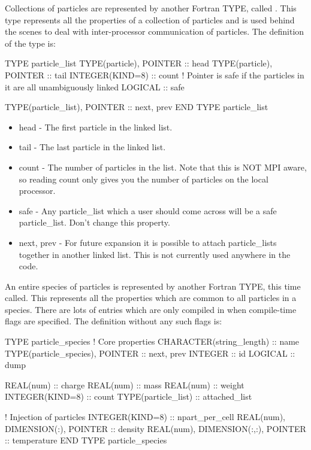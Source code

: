 Collections of particles are represented by another Fortran TYPE, called
. This type represents all the properties of a
collection of particles and is used behind the scenes to deal with
inter-processor communication of particles. The definition of the type is:
\begin{boxverbatim}
  TYPE particle_list
    TYPE(particle), POINTER :: head
    TYPE(particle), POINTER :: tail
    INTEGER(KIND=8) :: count
    ! Pointer is safe if the particles in it are all unambiguously linked
    LOGICAL :: safe

    TYPE(particle_list), POINTER :: next, prev
  END TYPE particle_list
\end{boxverbatim}
\begin{itemize}
\item head - The first particle in the linked list.
\item tail - The last particle in the linked list.
\item count - The number of particles in the list. Note that this is NOT MPI
  aware, so reading count only gives you the number of particles on the local
  processor.
\item safe - Any particle\_list which a user should come across will be a safe
  particle\_list. Don't change this property.
\item next, prev - For future expansion it is possible to attach particle\_lists
  together in another linked list. This is not currently used anywhere in the
  code.
\end{itemize}

An entire species of particles is represented by another Fortran TYPE, this
time called\linebreak {}. This represents all the
properties which are common to all particles in a species. There are lots
of entries which are only compiled in when compile-time flags are specified.
The definition without any such flags is:
\begin{boxverbatim}
  TYPE particle_species
    ! Core properties
    CHARACTER(string_length) :: name
    TYPE(particle_species), POINTER :: next, prev
    INTEGER :: id
    LOGICAL :: dump

    REAL(num) :: charge
    REAL(num) :: mass
    REAL(num) :: weight
    INTEGER(KIND=8) :: count
    TYPE(particle_list) :: attached_list

    ! Injection of particles
    INTEGER(KIND=8) :: npart_per_cell
    REAL(num), DIMENSION(:), POINTER :: density
    REAL(num), DIMENSION(:,:), POINTER :: temperature
  END TYPE particle_species
\end{boxverbatim}

